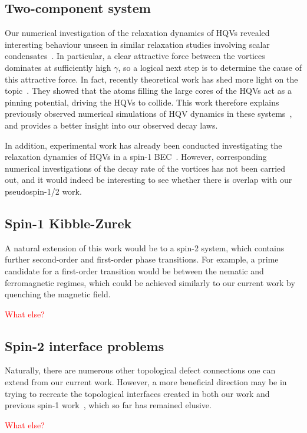 \subsection{Two-component system}
Our numerical investigation of the relaxation dynamics of HQVs revealed
interesting behaviour unseen in similar relaxation studies involving scalar
condensates~\cite{Karl2017}.
In particular, a clear attractive force between the vortices dominates at
sufficiently high \(\gamma \), so a logical next step is to determine the cause
of this attractive force.
In fact, recently theoretical work has shed more light on the
topic~\cite{Richaud2022}.
They showed that the atoms filling the large cores of the HQVs act as a pinning
potential, driving the HQVs to collide.
This work therefore explains previously observed numerical simulations of HQV
dynamics in these systems~\cite{Eto2011, Kasamatsu2016}, and provides a
better insight into our observed decay laws.

In addition, experimental work has already been conducted investigating the
relaxation dynamics of HQVs in a spin-1 BEC~\cite{Seo2016}.
However, corresponding numerical investigations of the decay rate of the
vortices has not been carried out, and it would indeed be interesting to see
whether there is overlap with our pseudospin-1/2 work.

\subsection{Spin-1 Kibble-Zurek}
A natural extension of this work would be to a spin-2 system, which contains
further second-order and first-order phase transitions.
For example, a prime candidate for a first-order transition would be between the
nematic and ferromagnetic regimes, which could be achieved similarly to our
current work by quenching the magnetic field.

\textcolor{red}{What else?}

\subsection{Spin-2 interface problems}
Naturally, there are numerous other topological defect connections one can
extend from our current work.
However, a more beneficial direction may be in trying to recreate the
topological interfaces created in both our work and previous spin-1
work~\cite{Borgh2012, Borgh2013, Borgh2014}, which so far has remained elusive.

\textcolor{red}{What else?}
